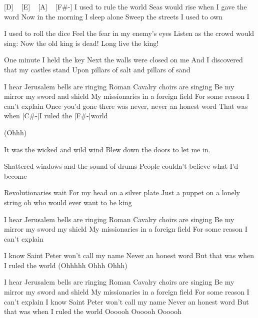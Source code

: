 [D] ~ [E] ~ [A] ~ [F#-]
I used to rule the world
Seas would rise when I gave the word
Now in the morning I sleep alone
Sweep the streets I used to own


I used to roll the dice
Feel the fear in my enemy's eyes
Listen as the crowd would sing:
Now the old king is dead! Long live the king!

One minute I held the key
Next the walls were closed on me
And I discovered that my castles stand
Upon pillars of salt and pillars of sand

I hear Jerusalem bells are ringing
Roman Cavalry choirs are singing
Be my mirror my sword and shield
My missionaries in a foreign field
For some reason I can't explain
Once you'd gone there was never, never an honest word
That was when [C#-]I ruled the [F#-]world

(Ohhh)

It was the wicked and wild wind
Blew down the doors to let me in.

Shattered windows and the sound of drums
People couldn't believe what I'd become

Revolutionaries wait
For my head on a silver plate
Just a puppet on a lonely string
oh who would ever want to be king

I hear Jerusalem bells are ringing
Roman Cavalry choirs are singing
Be my mirror my sword my shield
My missionaries in a foreign field
For some reason I can't explain

I know Saint Peter won't call my name
Never an honest word
But that was when I ruled the world
(Ohhhhh Ohhh Ohhh)

I hear Jerusalem bells are ringing
Roman Cavalry choirs are singing
Be my mirror my sword and shield
My missionaries in a foreign field
For some reason I can't explain
I know Saint Peter won't call my name
Never an honest word
But that was when I ruled the world
Oooooh Oooooh Oooooh 